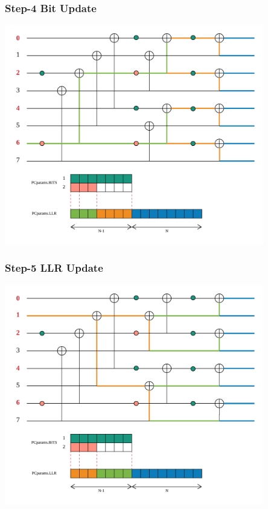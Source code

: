 \documentclass{beamer}
\begin{document}
\begin{frame}
\frametitle{Step-4 Bit Update}
  \begin{center}
  \includegraphics[width=0.85\textwidth]{pics/polar_-_SC_bit_4.png}
  \end{center}
\end{frame}

\begin{frame}
\frametitle{Step-5 LLR Update}
  \begin{center}
  \includegraphics[width=0.85\textwidth]{pics/polar_-_SC_llr_5.png}
  \end{center}
\end{frame}
\end{document}
